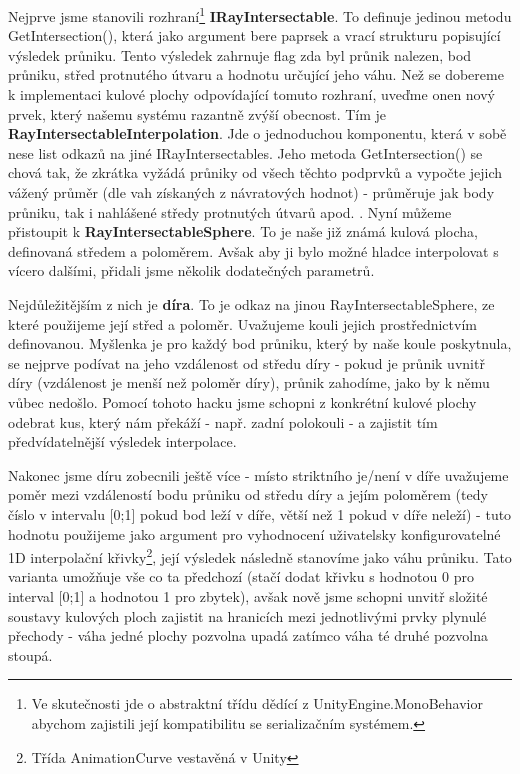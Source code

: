 Nejprve jsme stanovili rozhraní\footnote{Ve skutečnosti jde o abstraktní třídu dědící z UnityEngine.MonoBehavior abychom zajistili její kompatibilitu se serializačním systémem.} \textbf{IRayIntersectable}. To definuje jedinou metodu GetIntersection(), která jako argument bere paprsek a vrací strukturu popisující výsledek průniku. Tento výsledek zahrnuje flag zda byl průnik nalezen, bod průniku, střed protnutého útvaru a hodnotu určující jeho váhu.
\bigbreak
Než se dobereme k implementaci kulové plochy odpovídající tomuto rozhraní, uveďme onen nový prvek, který našemu systému razantně zvýší obecnost. Tím je \textbf{RayIntersectableInterpolation}. Jde o jednoduchou komponentu, která v sobě nese list odkazů na jiné IRayIntersectables. Jeho metoda GetIntersection() se chová tak, že zkrátka vyžádá průniky od všech těchto podprvků a vypočte jejich vážený průměr (dle vah získaných z návratových hodnot) - průměruje jak body průniku, tak i nahlášené středy protnutých útvarů apod. .
\bigbreak
Nyní můžeme přistoupit k \textbf{RayIntersectableSphere}. To je naše již známá kulová plocha, definovaná středem a poloměrem. Avšak aby ji bylo možné hladce interpolovat s vícero dalšími, přidali jsme několik dodatečných parametrů.

Nejdůležitějším z nich je \textbf{díra}. To je odkaz na jinou RayIntersectableSphere, ze které použijeme její střed a poloměr. Uvažujeme kouli jejich prostřednictvím definovanou. Myšlenka je pro každý bod průniku, který by naše koule poskytnula, se nejprve podívat na jeho vzdálenost od středu díry - pokud je průnik uvnitř díry (vzdálenost je menší než poloměr díry), průnik zahodíme, jako by k němu vůbec nedošlo. Pomocí tohoto hacku jsme schopni z konkrétní kulové plochy odebrat kus, který nám překáží - např. zadní polokouli - a zajistit tím předvídatelnější výsledek interpolace.

Nakonec jsme díru zobecnili ještě více - místo striktního je/není v díře uvažujeme poměr mezi vzdáleností bodu průniku od středu díry a jejím poloměrem (tedy číslo v intervalu [0;1] pokud bod leží v díře, větší než 1 pokud v díře neleží) - tuto hodnotu použijeme jako argument pro vyhodnocení uživatelsky konfigurovatelné 1D interpolační křivky\footnote{Třída AnimationCurve vestavěná v Unity}, její výsledek následně stanovíme jako váhu průniku. Tato varianta umožňuje vše co ta předchozí (stačí dodat křivku s hodnotou 0 pro interval [0;1] a hodnotou 1 pro zbytek), avšak nově jsme schopni unvitř složité soustavy kulových ploch zajistit na hranicích mezi jednotlivými prvky plynulé přechody - váha jedné plochy pozvolna upadá zatímco váha té druhé pozvolna stoupá.

